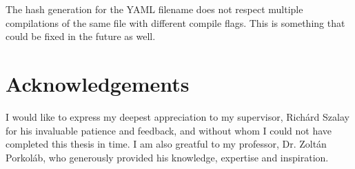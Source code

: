The hash generation for the YAML filename does not respect multiple compilations of the same file with different compile flags. This is something
that could be fixed in the future as well.

\section*{Acknowledgements}

I would like to express my deepest appreciation to my supervisor, Richárd Szalay for his invaluable patience and feedback, and without whom
I could not have completed this thesis in time. I am also greatful to my professor, Dr. Zoltán Porkoláb, who generously provided his knowledge,
expertise and inspiration.